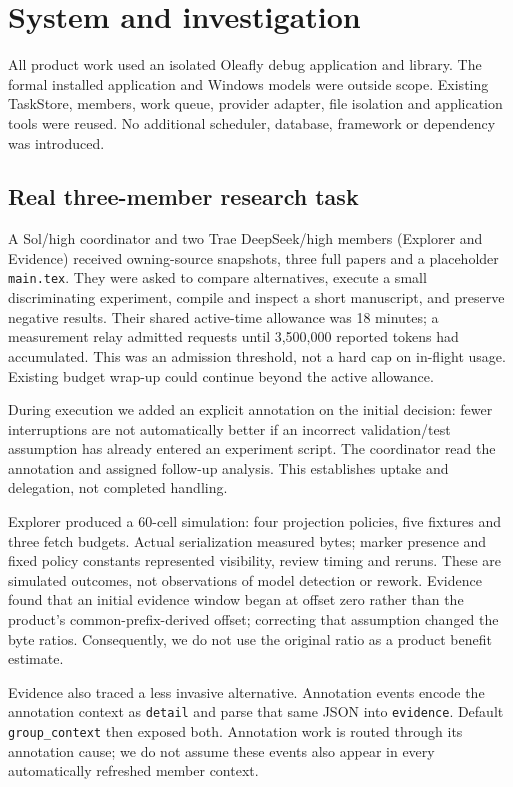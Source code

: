 \documentclass[11pt,a4paper]{article}
\begin{document}
\section{System and investigation}
All product work used an isolated Oleafly debug application and library. The formal installed application and Windows models were outside scope. Existing TaskStore, members, work queue, provider adapter, file isolation and application tools were reused. No additional scheduler, database, framework or dependency was introduced.

\subsection{Real three-member research task}
A Sol/high coordinator and two Trae DeepSeek/high members (Explorer and Evidence) received owning-source snapshots, three full papers and a placeholder \texttt{main.tex}. They were asked to compare alternatives, execute a small discriminating experiment, compile and inspect a short manuscript, and preserve negative results. Their shared active-time allowance was 18 minutes; a measurement relay admitted requests until 3,500,000 reported tokens had accumulated. This was an admission threshold, not a hard cap on in-flight usage. Existing budget wrap-up could continue beyond the active allowance.

During execution we added an explicit annotation on the initial decision: fewer interruptions are not automatically better if an incorrect validation/test assumption has already entered an experiment script. The coordinator read the annotation and assigned follow-up analysis. This establishes uptake and delegation, not completed handling.

Explorer produced a 60-cell simulation: four projection policies, five fixtures and three fetch budgets. Actual serialization measured bytes; marker presence and fixed policy constants represented visibility, review timing and reruns. These are simulated outcomes, not observations of model detection or rework. Evidence found that an initial evidence window began at offset zero rather than the product's common-prefix-derived offset; correcting that assumption changed the byte ratios. Consequently, we do not use the original ratio as a product benefit estimate.

Evidence also traced a less invasive alternative. Annotation events encode the annotation context as \texttt{detail} and parse that same JSON into \texttt{evidence}. Default \texttt{group\_context} then exposed both. Annotation work is routed through its annotation cause; we do not assume these events also appear in every automatically refreshed member context.
\end{document}
